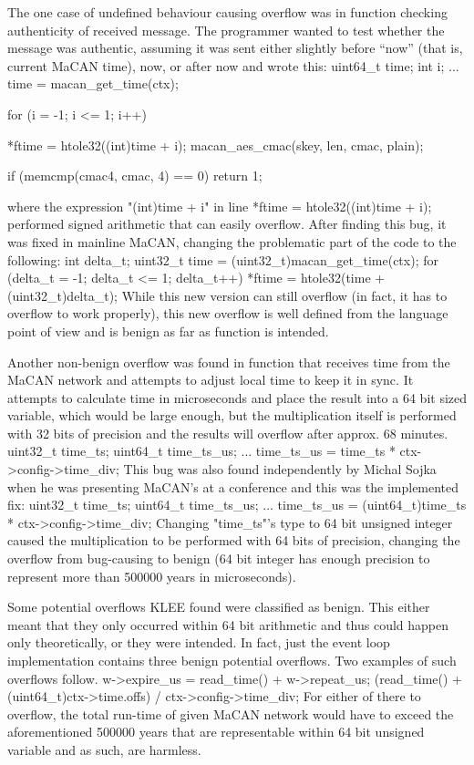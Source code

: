 The one case of undefined behaviour causing overflow was in function checking
authenticity of received message. The programmer wanted to test whether the
message was authentic, assuming it was sent either slightly before ``now''
(that is, current MaCAN time), now, or after now and wrote this:
\begtt
uint64_t time;
int i;
...
time = macan_get_time(ctx);

for (i = -1; i <= 1; i++) {
    *ftime = htole32((int)time + i);
    macan_aes_cmac(skey, len, cmac, plain);

    if (memcmp(cmac4, cmac, 4) == 0) {
        return 1;
    }
}
\endtt
where the expression "(int)time + i" in line 
\begtt
*ftime = htole32((int)time + i);
\endtt
performed signed arithmetic that can easily overflow. After finding this bug,
it was fixed in mainline MaCAN, changing the problematic part of the code to
the following:
\begtt
int delta_t;
uint32_t time = (uint32_t)macan_get_time(ctx);
for (delta_t = -1; delta_t <= 1; delta_t++) {
    *ftime = htole32(time + (uint32_t)delta_t);
}
\endtt
While this new version can still overflow (in fact, it has to overflow to work
properly), this new overflow is well defined from the language point of view
and is benign as far as function is intended.

Another non-benign overflow was found in function that receives time from the
MaCAN network and attempts to adjust local time to keep it in sync. It attempts
to calculate time in microseconds and place the result into a 64 bit sized
variable, which would be large enough, but the multiplication itself is
performed with 32 bits of precision and the results will overflow after approx.
68 minutes.
\begtt
uint32_t time_ts;
uint64_t time_ts_us;
...
time_ts_us = time_ts * ctx->config->time_div;
\endtt
This bug was also found independently by Michal Sojka when he was presenting
MaCAN's at a conference and this was the implemented fix:
\begtt
uint32_t time_ts;
uint64_t time_ts_us;
...
time_ts_us = (uint64_t)time_ts * ctx->config->time_div;
\endtt
Changing "time_ts"'s type to 64 bit unsigned integer caused the multiplication
to be performed with 64 bits of precision, changing the overflow from
bug-causing to benign (64 bit integer has enough precision to represent more
than 500000 years in microseconds).

Some potential overflows KLEE found were classified as benign. This either
meant that they only occurred within 64 bit arithmetic and thus could happen
only theoretically, or they were intended. In fact, just the event loop
implementation contains three benign potential overflows. Two examples of such
overflows follow.
\begtt
w->expire_us = read_time() + w->repeat_us;
\endtt
\begtt
(read_time() + (uint64_t)ctx->time.offs) / ctx->config->time_div;
\endtt
For either of there to overflow, the total run-time of given MaCAN network
would have to exceed the aforementioned 500000 years that are representable
within 64 bit unsigned variable and as such, are harmless.

